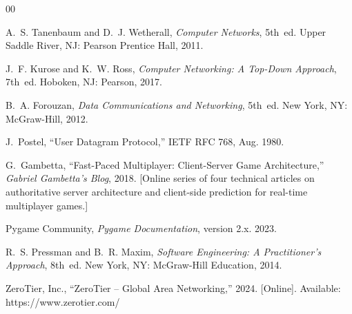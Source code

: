 \documentclass[conference]{IEEEtran}
\begin{document}
\begin{thebibliography}{00}

A.~S. Tanenbaum and D.~J. Wetherall,
\textit{Computer Networks}, 5th~ed.
Upper Saddle River, NJ: Pearson Prentice Hall, 2011.

J.~F. Kurose and K.~W. Ross,
\textit{Computer Networking: A Top-Down Approach}, 7th~ed.
Hoboken, NJ: Pearson, 2017.

B.~A. Forouzan,
\textit{Data Communications and Networking}, 5th~ed.
New York, NY: McGraw-Hill, 2012.

J.~Postel,
``User Datagram Protocol,''
IETF RFC 768, Aug. 1980.

G.~Gambetta,
``Fast-Paced Multiplayer: Client-Server Game Architecture,''
\textit{Gabriel Gambetta's Blog}, 2018.
[Online series of four technical articles on authoritative
server architecture and client-side prediction for real-time
multiplayer games.]

Pygame Community,
\textit{Pygame Documentation}, version 2.x.
2023.

R.~S. Pressman and B.~R. Maxim,
\textit{Software Engineering: A Practitioner's Approach}, 8th~ed.
New York, NY: McGraw-Hill Education, 2014.

ZeroTier, Inc.,
``ZeroTier -- Global Area Networking,''
2024.
[Online]. Available: https://www.zerotier.com/

\end{thebibliography}
\end{document}
